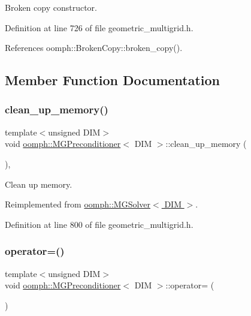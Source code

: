 Broken copy constructor. 



Definition at line 726 of file geometric\+\_\+multigrid.\+h.



References oomph\+::\+Broken\+Copy\+::broken\+\_\+copy().



\subsection{Member Function Documentation}
\mbox{\label{classoomph_1_1MGPreconditioner_acc92bd3f8c9b729283d35c1f4ae37dd2}} 
\subsubsection{\texorpdfstring{clean\+\_\+up\+\_\+memory()}{clean\_up\_memory()}}
{\footnotesize\ttfamily template$<$unsigned D\+IM$>$ \\
void \hyperlink{classoomph_1_1MGPreconditioner}{oomph\+::\+M\+G\+Preconditioner}$<$ D\+IM $>$\+::clean\+\_\+up\+\_\+memory (\begin{DoxyParamCaption}{ }\end{DoxyParamCaption})\hspace{0.3cm}{\ttfamily [inline]}, {\ttfamily [virtual]}}



Clean up memory. 



Reimplemented from \hyperlink{classoomph_1_1MGSolver_a85e3e6f32b4e77d696d5b001e1428f08}{oomph\+::\+M\+G\+Solver$<$ D\+I\+M $>$}.



Definition at line 800 of file geometric\+\_\+multigrid.\+h.

\mbox{\label{classoomph_1_1MGPreconditioner_ad7b9ea2798522fc6ae0aff7455ef4885}} 
\subsubsection{\texorpdfstring{operator=()}{operator=()}}
{\footnotesize\ttfamily template$<$unsigned D\+IM$>$ \\
void \hyperlink{classoomph_1_1MGPreconditioner}{oomph\+::\+M\+G\+Preconditioner}$<$ D\+IM $>$\+::operator= (\begin{DoxyParamCaption}\item[{const \hyperlink{classoomph_1_1MGPreconditioner}{M\+G\+Preconditioner}$<$ D\+IM $>$ \&}]{ }\end{DoxyParamCaption})\hspace{0.3cm}{\ttfamily [inline]}}



